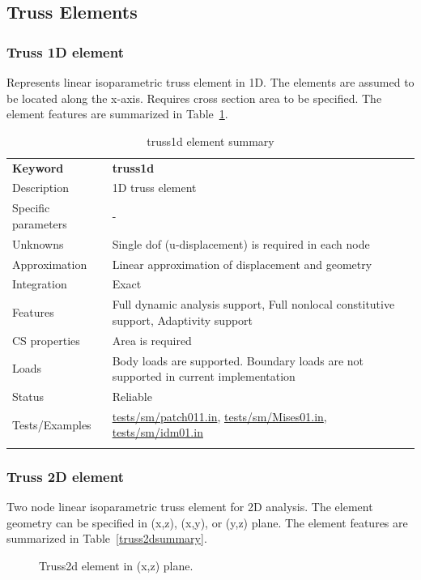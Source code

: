 \documentclass[a4paper]{article}
\newcommand{\templabel}{}%
\newcommand{\tempcaption}{}%
\newcounter{nelpar}
\newenvironment{elementsummary}[5]{%
  \gdef\tempcaption{#4}%
  \gdef\templabel{#5}%
  \setcounter{nelpar}{0}%
  \begin{center} %
    \begin{table}[!htb] %
      \begin{tabular}{|l|p{9cm}|}\hline %
        {\bf Keyword} & \bf{#1}\\ %
        {Description} & {#2}\\ %
        {Specific parameters} & {#3}\\ \hline %
}{
  \\ \hline %
      \end{tabular}%
      \caption{\tempcaption}%
      \label{\templabel}%
    \end{table}%
  \end{center}%
}
\newcommand{\elementDescription}[2]{{#1} & {#2}\\}
\begin{document}
\subsection{Truss Elements}

\subsubsection{Truss 1D element}
\label{Truss1d}

Represents linear isoparametric truss element in 1D. The elements are
assumed to be located along the x-axis. Requires cross section area to be
specified. The element features are summarized in Table~\ref{truss1dsummary}.

\begin{elementsummary}{truss1d}{1D truss element}{-}{truss1d element summary}{truss1dsummary}
\elementDescription{Unknowns}{Single dof (u-displacement) is required in each node}
\elementDescription{Approximation}{Linear approximation of displacement and geometry}
\elementDescription{Integration}{Exact}
\elementDescription{Features}{Full dynamic analysis support, Full nonlocal constitutive support, Adaptivity support}
\elementDescription{CS properties}{Area is required}
\elementDescription{Loads}{Body loads are supported. Boundary loads are
not supported in current implementation}
\elementDescription{Status}{Reliable}
\elementDescription{Tests/Examples}{\href{https://github.com/oofem/oofem/blob/devel/tests/sm/patch011.in}{tests/sm/patch011.in}, \href{https://github.com/oofem/oofem/blob/devel/tests/sm/Mises01.in}{tests/sm/Mises01.in}, \href{https://github.com/oofem/oofem/blob/devel/tests/sm/idm01.in}{tests/sm/idm01.in}}
\end{elementsummary}



\subsubsection{Truss 2D element}
\label{Truss2d}



Two node linear isoparametric truss element for 2D analysis. The
element geometry can be specified in (x,z), (x,y), or (y,z) plane. The element features are summarized in Table~\ref{truss2dsummary}.

\begin{figure}[htb]
 \centering
 \begin{makeimage}
  
 \end{makeimage}
 \caption{Truss2d element in (x,z) plane.}
\end{figure}
\end{document}
